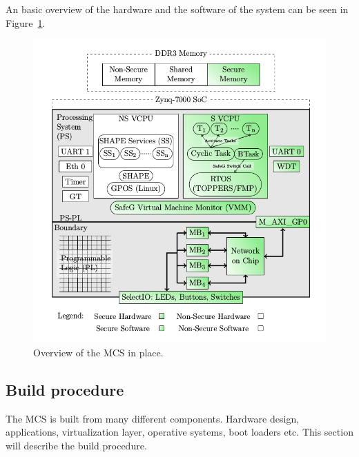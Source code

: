 An basic overview of the hardware and the software of the system can be seen in Figure~\ref{fig:system_overview}.

\begin{figure}[H]
\centering
\includegraphics[width=\textwidth]{./img/literature_overview.png}
\caption{Overview of the MCS in place.\cite{zaki2016}}\label{fig:system_overview}
\end{figure}

\subsection{Build procedure}
The MCS is built from many different components. Hardware design,  applications, virtualization layer, operative systems, boot loaders etc. This section will describe the build procedure.\\ %

